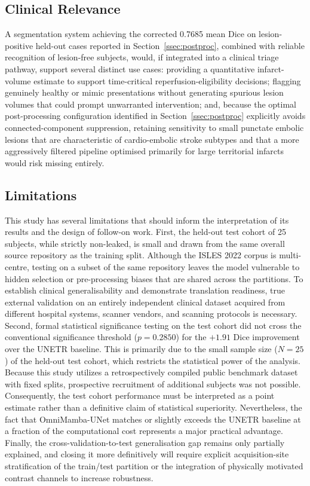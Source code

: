 \documentclass[pdflatex,sn-mathphys-num]{sn-jnl}
\begin{document}
\subsection{Clinical Relevance}\label{ssec:clinical}
A segmentation system achieving the corrected 0.7685 mean Dice on
lesion-positive held-out cases reported in Section~\ref{ssec:postproc},
combined with reliable recognition of lesion-free subjects, would, if
integrated into a clinical triage pathway, support several distinct
use cases: providing a quantitative infarct-volume estimate to support
time-critical reperfusion-eligibility decisions; flagging genuinely
healthy or mimic presentations without generating spurious lesion
volumes that could prompt unwarranted intervention; and, because the
optimal post-processing configuration identified in
Section~\ref{ssec:postproc} explicitly avoids connected-component
suppression, retaining sensitivity to small punctate embolic lesions
that are characteristic of cardio-embolic stroke subtypes and that a
more aggressively filtered pipeline optimised primarily for large
territorial infarcts would risk missing entirely.

\subsection{Limitations}\label{ssec:limitations}
This study has several limitations that should inform the interpretation of its results and the design of follow-on work. First, the held-out test cohort of 25 subjects, while strictly non-leaked, is small and drawn from the same overall source repository as the training split. Although the ISLES 2022 corpus is multi-centre, testing on a subset of the same repository leaves the model vulnerable to hidden selection or pre-processing biases that are shared across the partitions. To establish clinical generalisability and demonstrate translation readiness, true external validation on an entirely independent clinical dataset acquired from different hospital systems, scanner vendors, and scanning protocols is necessary. Second, formal statistical significance testing on the test cohort did not cross the conventional significance threshold ($p = 0.2850$) for the $+1.91$ Dice improvement over the UNETR baseline. This is primarily due to the small sample size ($N = 25$) of the held-out test cohort, which restricts the statistical power of the analysis. Because this study utilizes a retrospectively compiled public benchmark dataset with fixed splits, prospective recruitment of additional subjects was not possible. Consequently, the test cohort performance must be interpreted as a point estimate rather than a definitive claim of statistical superiority. Nevertheless, the fact that OmniMamba-UNet matches or slightly exceeds the UNETR baseline at a fraction of the computational cost represents a major practical advantage. Finally, the cross-validation-to-test generalisation gap remains only partially explained, and closing it more definitively will require explicit acquisition-site stratification of the train/test partition or the integration of physically motivated contrast channels to increase robustness.
\end{document}
